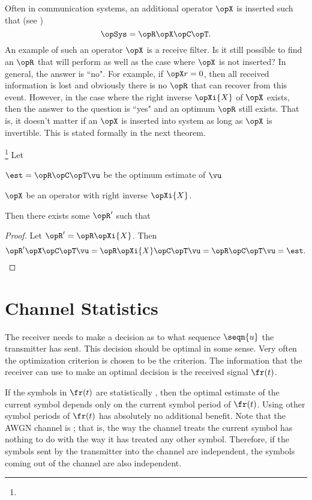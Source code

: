 Often in communication systems, an additional  operator $\opX$ is
inserted such that (see )
   \[ \opSys = \opR\opX\opC\opT.\]
An example of such an operator $\opX$ is a receive filter.
Is it still possible to find an $\opR$ that will perform as well as
the case where $\opX$ is not inserted?
In general, the answer is ``no".
For example, if $\opX r=0$, then all received information is lost
and obviously there is no $\opR$ that can recover from this event.
However, in the case where the right inverse $\opXi{X}$ of $\opX$ exists,
then the answer to the question is ``yes" and an optimum  $\opR$
still exists.
That is, it doesn't matter if an $\opX$ is inserted into system
as long as $\opX$ is invertible.
This is stated formally in the next theorem.
\begin{theorem}
\footnote{
  }
\label{thm:reversibility}
Let
\begin{liste}
   \item $\est = \opR\opC\opT\vu$ be the optimum estimate of $\vu$
   \item $\opX$ be an operator with right inverse $\opXi{X}$.
\end{liste}
Then there exists some $\opR'$ such that
\end{theorem}
\begin{proof}
  Let $\opR'=\opR\opXi{X}$.
  Then
  \[ \opR'\opX\opC\opT\vu = \opR\opXi{X}\opC\opT\vu = \opR\opC\opT\vu = \est. \]
\end{proof}





\section{Channel Statistics}
The receiver needs to make a decision as to what
sequence $\seqn{u}$ the transmitter has sent.
This decision should be optimal in some sense.
Very often the optimization criterion is chosen to be
the  criterion.
The information that the receiver can use to make an optimal
decision is the received signal $\fr(t)$.

If the symbols in $\fr(t)$ are statistically ,
then the optimal estimate of the current symbol depends only on the
current symbol period of $\fr(t)$.
Using other symbol periods of $\fr(t)$ has absolutely no
additional benefit.
Note that the AWGN channel is ;
that is, the way the channel treats the current symbol has
nothing to do with the way it has treated any other symbol.
Therefore, if the symbols sent by the transmitter into the channel
are independent, the symbols coming out of the channel are also
independent.

